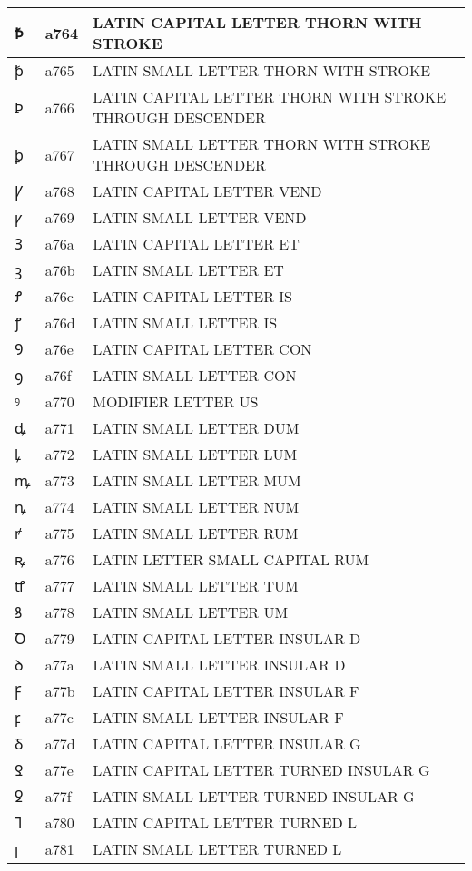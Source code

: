 \documentclass[12pt,letterpaper,openany]{book}
\begin{document}
\begin{center}
\begin{supertabular}{|m{0.25in}|m{0.5in}|m{4in}|}
Ꝥ & a764 & LATIN CAPITAL LETTER THORN WITH STROKE\\\hline
ꝥ & a765 & LATIN SMALL LETTER THORN WITH STROKE\\\hline
Ꝧ & a766 & LATIN CAPITAL LETTER THORN WITH STROKE THROUGH DESCENDER\\\hline
ꝧ & a767 & LATIN SMALL LETTER THORN WITH STROKE THROUGH DESCENDER\\\hline
Ꝩ & a768 & LATIN CAPITAL LETTER VEND\\\hline
ꝩ & a769 & LATIN SMALL LETTER VEND\\\hline
Ꝫ & a76a & LATIN CAPITAL LETTER ET\\\hline
ꝫ & a76b & LATIN SMALL LETTER ET\\\hline
Ꝭ & a76c & LATIN CAPITAL LETTER IS\\\hline
ꝭ & a76d & LATIN SMALL LETTER IS\\\hline
Ꝯ & a76e & LATIN CAPITAL LETTER CON\\\hline
ꝯ & a76f & LATIN SMALL LETTER CON\\\hline
ꝰ & a770 & MODIFIER LETTER US\\\hline
ꝱ & a771 & LATIN SMALL LETTER DUM\\\hline
ꝲ & a772 & LATIN SMALL LETTER LUM\\\hline
ꝳ & a773 & LATIN SMALL LETTER MUM\\\hline
ꝴ & a774 & LATIN SMALL LETTER NUM\\\hline
ꝵ & a775 & LATIN SMALL LETTER RUM\\\hline
ꝶ & a776 & LATIN LETTER SMALL CAPITAL RUM\\\hline
ꝷ & a777 & LATIN SMALL LETTER TUM\\\hline
ꝸ & a778 & LATIN SMALL LETTER UM\\\hline
Ꝺ & a779 & LATIN CAPITAL LETTER INSULAR D\\\hline
ꝺ & a77a & LATIN SMALL LETTER INSULAR D\\\hline
Ꝼ & a77b & LATIN CAPITAL LETTER INSULAR F\\\hline
ꝼ & a77c & LATIN SMALL LETTER INSULAR F\\\hline
Ᵹ & a77d & LATIN CAPITAL LETTER INSULAR G\\\hline
Ꝿ & a77e & LATIN CAPITAL LETTER TURNED INSULAR G\\\hline
ꝿ & a77f & LATIN SMALL LETTER TURNED INSULAR G\\\hline
Ꞁ & a780 & LATIN CAPITAL LETTER TURNED L\\\hline
ꞁ & a781 & LATIN SMALL LETTER TURNED L\\\hline

\end{supertabular}
\end{center}
\end{document}

